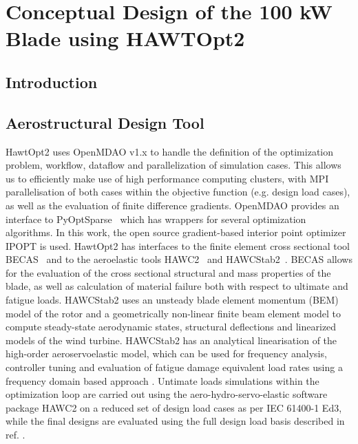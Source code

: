 
\chapter{Conceptual Design of the 100 kW Blade using HAWTOpt2}

\section{Introduction}


\section{Aerostructural Design Tool}
\label{sec:blade_design_tool}



HawtOpt2 uses OpenMDAO v1.x \cite{openmdao} to handle the definition of the optimization problem, workflow, dataflow and parallelization of simulation cases.
This allows us to efficiently make use of high performance computing clusters, with MPI parallelisation of both cases within the objective function (e.g. design load cases), as well as the evaluation of finite difference gradients.
OpenMDAO provides an interface to PyOptSparse~\cite{pyopt} which has wrappers for several optimization algorithms.
In this work, the open source gradient-based interior point optimizer IPOPT \cite{ipopt} is used. 
HawtOpt2 has interfaces to the finite element cross sectional tool BECAS~\cite{blasquesb, becas} and to the aeroelastic tools HAWC2~\cite{hawc2_manual} and HAWCStab2~\cite{hansen_aeroelastic_2004}. 
BECAS allows for the evaluation of the cross sectional structural and mass properties of the blade, as well as calculation of material failure both with respect to ultimate and fatigue loads.
HAWCStab2 uses an unsteady blade element momentum (BEM) model of the rotor and a geometrically non-linear finite beam element model to compute steady-state aerodynamic states, structural deflections and linearized models of the wind turbine. 
HAWCStab2 has an analytical linearisation of the high-order aeroservoelastic model, which can be used for frequency analysis, controller tuning and evaluation of fatigue damage equivalent load rates using a frequency domain based approach \cite{tibaldi2015}. 
Untimate loads simulations within the optimization loop are carried out using the aero-hydro-servo-elastic software package HAWC2 on a reduced set of design load cases as per IEC 61400-1 Ed3, while the final designs are evaluated using the full design load basis described in ref. \cite{hansen2015}.


